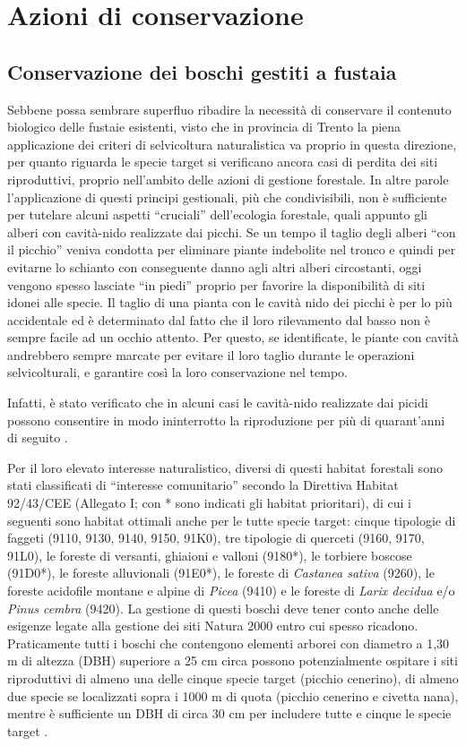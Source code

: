 \documentclass[10pt,twoside,openany,x11names,svgnames,italian,a5paper,dvipsnames,table]{memoir}
\newcommand\chapterillustration{}
\begin{document}
 
\chapter{Azioni di conservazione}
\renewcommand\chapterillustration{5.JPG}


\section{Conservazione dei boschi gestiti a fustaia}
Sebbene possa sembrare superfluo ribadire la necessità di conservare il contenuto biologico delle fustaie esistenti, visto che in provincia di Trento la piena applicazione dei criteri di selvicoltura naturalistica va proprio in questa direzione, per quanto riguarda le specie target si verificano ancora casi di perdita dei siti riproduttivi, proprio nell’ambito delle azioni di gestione forestale. In altre parole l’applicazione di questi principi gestionali, più che condivisibili, non è sufficiente per tutelare alcuni aspetti “cruciali” dell’ecologia forestale, quali appunto gli alberi con cavità-nido realizzate dai picchi. Se un tempo il taglio degli alberi “con il picchio” veniva condotta per eliminare piante indebolite nel tronco e quindi per evitarne lo schianto con conseguente danno agli altri alberi circostanti, oggi vengono spesso lasciate “in piedi” proprio per favorire la disponibilità di siti idonei alle specie. Il taglio di una pianta con le cavità nido dei picchi è per lo più accidentale ed è determinato dal fatto che il loro rilevamento dal basso non è sempre facile ad un occhio attento. Per questo, se identificate, le piante con cavità andrebbero sempre marcate per evitare il loro taglio durante le operazioni selvicolturali, e garantire così la loro conservazione nel tempo.

Infatti, è stato verificato che in alcuni casi le cavità-nido realizzate dai picidi possono consentire in modo ininterrotto la riproduzione per più di quarant’anni di seguito \cite{Marchesi08}. 

Per il loro elevato interesse naturalistico, diversi di questi habitat forestali sono stati classificati di “interesse comunitario” secondo la Direttiva Habitat 92/43/CEE (Allegato I; con * sono indicati gli habitat prioritari), di cui i seguenti sono habitat ottimali anche per le tutte specie target: cinque tipologie di faggeti (9110, 9130, 9140, 9150, 91K0), tre tipologie di querceti (9160, 9170, 91L0), le foreste di versanti, ghiaioni e valloni (9180*), le torbiere boscose (91D0*), le foreste alluvionali (91E0*), le foreste di \emph{Castanea sativa} (9260), le foreste acidofile montane e alpine di \emph{Picea} (9410) e le foreste di \emph{Larix decidua} e/o \emph{Pinus cembra} (9420). La gestione di questi boschi deve tener conto anche delle esigenze legate alla gestione dei siti Natura 2000 entro cui spesso ricadono.
Praticamente tutti i boschi che contengono elementi arborei con diametro a 1,30 m di altezza (DBH) superiore a 25 cm circa possono potenzialmente ospitare i siti riproduttivi di almeno una delle cinque specie target (picchio cenerino), di almeno due specie se localizzati sopra i 1000 m di quota (picchio cenerino e civetta nana), mentre è sufficiente un DBH di circa 30 cm per includere tutte e cinque le specie target \cite{Marchesi08}. 
\end{document}
